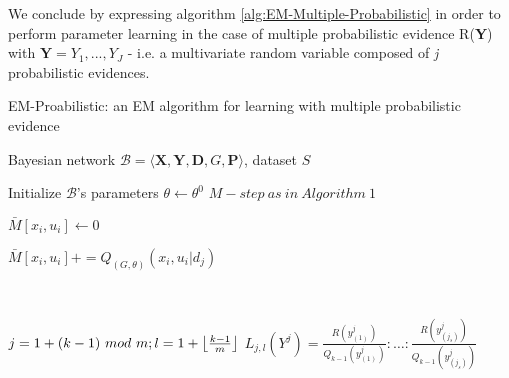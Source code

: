 \documentclass[11pt]{article}
\begin{document}
\begin{article}
We conclude by expressing algorithm
\ref{alg:EM-Multiple-Probabilistic} in order to perform parameter
learning in the case of multiple probabilistic evidence R(\textbf{Y}) with
\(\textbf{Y} = {Y_1, ..., Y_J}\) - i.e. a multivariate random
variable composed of \emph{j} probabilistic evidences.

\algrenewcommand\algorithmicindent{1.5em}%

\begin{algorithm*}[h!]
\caption{EM-Proabilistic: an EM algorithm for learning with multiple probabilistic evidence}
\label{alg:EM-Multiple-Probabilistic}
\vspace{-10pt}
\begin{multicols}{2}
\begin{algorithmic}[1] 
\Require Bayesian network $\mathcal{B}=\langle \mathbf{X}, \mathbf{Y},\mathbf{D}, G, \mathbf{P} \rangle$, dataset $S$ 

\State Initialize $\mathcal{B}$'s parameters $\theta \leftarrow \theta^0$
  \State $M-step \ as \ in \ Algorithm \ 1$
\EndFor
\\
 

   \State $\bar{M}[x_{i},u_{i}]\leftarrow 0$
  \EndFor
\EndFor

     

        \State $\bar{M}[x_{i},u_{i}] \mathrel{{+}{=}} Q_{(G,\theta)}(x_{i},u_{i}|d_{j})$ 
      \EndFor
    \EndFor
\EndFor
\EndFunction
\\

\\

  \State $j = 1 + (k-1) \ mod \ m; l = 1 + \floor*{\frac{k-1}{m}}$
  \State $L_{j,l}(Y^j) = \frac{R(y^j_{(1)})}{Q_{k-1}(y^j_{(1)})} : \ldots : \frac{R(y^j_{(j_s)})}{Q_{k-1}(y^j_{(j_s)})}$ 
\\
\\
\end{algorithmic}
\end{multicols}
\end{algorithm*}
\end{article}
\end{document}
